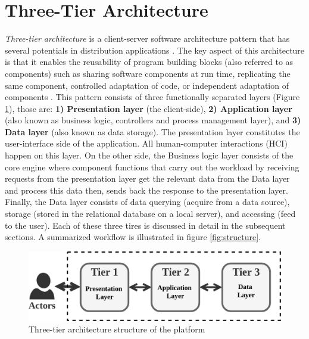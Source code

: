 \documentclass{scsSimAUDPaperFormat}
\begin{document}
\section{Three-Tier Architecture}
\label{section1}
\textit{Three-tier architecture} is a client-server software architecture pattern that has several potentials in distribution applications \cite{Booch2008Object-orientedEdition}. The key aspect of this architecture is that it enables the reusability of program building blocks (also referred to as components) such as sharing software components at run time, replicating the same component, controlled adaptation of code, or independent adaptation of components \cite{Taylor1998ThePerspective,Wijegunaratne1998DistributedEngineering}. This pattern consists of three functionally separated layers \cite{Schuldt2017Multi-tierArchitecture} (Figure \ref{fig:figure1}), those are: \textbf{1) Presentation layer} (the client-side), \textbf{2) Application layer} (also known as business logic, controllers and process management layer), and \textbf{3) Data layer} (also known as data storage). The presentation layer constitutes the user-interface side of the application. All human-computer interactions (HCI) happen on this layer. On the other side, the Business logic layer consists of the core engine where component functions that carry out the workload by receiving requests from the presentation layer get the relevant data from the Data layer and process this data then, sends back the response to the presentation layer. Finally, the Data layer consists of data querying (acquire from a data source), storage (stored in the relational database on a local server), and accessing (feed to the user). Each of these three tires is discussed in detail in the subsequent sections. A summarized workflow is illustrated in figure \ref{fig:structure}. 

\begin{figure}
\centering
\includegraphics[width=0.9\columnwidth]{imgs/three_tier_architecture_summary.png}
\caption{Three-tier architecture structure of the platform}
\label{fig:figure1}
\end{figure}
\end{document}
